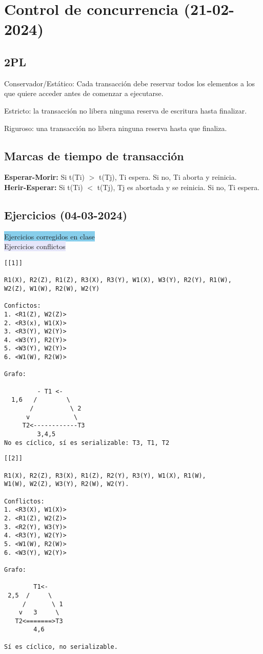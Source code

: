 \documentclass{article}
\begin{document}
\section{Control de concurrencia (21-02-2024)}
\subsection{2PL}
\begin{theorem}
Conservador/Estático: Cada transacción debe reservar todos los elementos a los que quiere acceder antes de comenzar a ejecutarse.
\end{theorem}
\begin{theorem}
Estricto: la transacción no libera ninguna reserva de escritura hasta finalizar.
\end{theorem}
\begin{theorem}
Riguroso: una transacción no libera ninguna reserva hasta que finaliza.
\end{theorem}
\subsection{Marcas de tiempo de transacción}
\textbf{Esperar-Morir:} Si t(Ti) $>$ t(Tj), Ti espera. Si no, Ti aborta y reinicia.\\
\textbf{Herir-Esperar:} Si t(Ti) $<$ t(Tj), Tj es abortada y se reinicia. Si no, Ti espera. 
\subsection{Ejercicios (04-03-2024)}
\colorbox{SkyBlue}{Ejercicios corregidos en clase}\\
\colorbox{Lavender}{Ejercicios conflictos}
\begin{verbatim}
[[1]]

R1(X), R2(Z), R1(Z), R3(X), R3(Y), W1(X), W3(Y), R2(Y), R1(W),
W2(Z), W1(W), R2(W), W2(Y)

Confictos:
1. <R1(Z), W2(Z)>
2. <R3(x), W1(X)>
3. <R3(Y), W2(Y)>
4. <W3(Y), R2(Y)>
5. <W3(Y), W2(Y)>
6. <W1(W), R2(W)>

Grafo:

         - T1 <-
  1,6   /        \
       /          \ 2
      v            \
     T2<------------T3
         3,4,5
No es cíclico, sí es serializable: T3, T1, T2
\end{verbatim}

\begin{verbatim}
[[2]]

R1(X), R2(Z), R3(X), R1(Z), R2(Y), R3(Y), W1(X), R1(W),
W1(W), W2(Z), W3(Y), R2(W), W2(Y).

Conflictos:
1. <R3(X), W1(X)>
2. <R1(Z), W2(Z)>
3. <R2(Y), W3(Y)>
4. <R3(Y), W2(Y)>
5. <W1(W), R2(W)>
6. <W3(Y), W2(Y)>

Grafo:

        T1<- 
 2,5  /     \      
     /       \ 1
    v   3     \
   T2<=======>T3    
        4,6
       
Sí es cíclico, no serializable.        
\end{verbatim}
\end{document}
